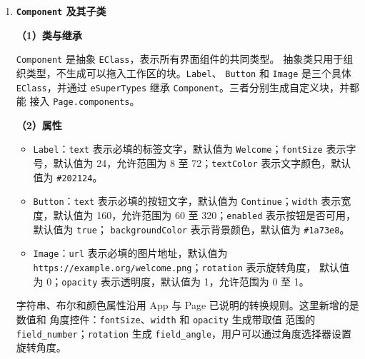 \begin{enumerate}
\begin{lstlisting}[style=tfmjavascript, captionpos=t, caption={\texttt{Page} 块生成代码中的新增部分}, label={lst:basic-generated-page}]
  // EString + field_colour 注解生成颜色选择控件。
  "message3": "backgroundColor %1",
  "args3": [{"type":"field_colour",
             "name":"backgroundColor",
             "colour":"#ffffff"}],

  // 包含引用生成只接受 Component 类型的结构输入。
  "message6": "components %1",
  "args6": [{"type":"input_statement",
             "name":"components",
             "check":"Component"}],

  // Page 块自身只能接入 App.pages 等 Page 类型连接位置。
  "previousStatement": "Page",
  "nextStatement": "Page"
}
\end{lstlisting}

  \texttt{check="Component"} 限定 \texttt{components} 中可接入的块类型；
  \texttt{previousStatement} 和 \texttt{nextStatement} 则声明
  \texttt{Page} 块自身的连接类型，使多个页面能够在 \texttt{App.pages} 中连续
  排列。

  \item \textbf{\texttt{Component} 及其子类}

  \textbf{（1）类与继承}

  \texttt{Component} 是抽象 \texttt{EClass}，表示所有界面组件的共同类型。
  抽象类只用于组织类型，不生成可以拖入工作区的块。\texttt{Label}、
  \texttt{Button} 和 \texttt{Image} 是三个具体 \texttt{EClass}，并通过
  \texttt{eSuperTypes} 继承 \texttt{Component}。三者分别生成自定义块，并都能
  接入 \texttt{Page.components}。

  \textbf{（2）属性}

  \begin{itemize}
    \item \texttt{Label}：\texttt{text} 表示必填的标签文字，默认值为
    \texttt{Welcome}；\texttt{fontSize} 表示字号，默认值为 24，允许范围为
    8 至 72；\texttt{textColor} 表示文字颜色，默认值为 \texttt{\#202124}。
    \item \texttt{Button}：\texttt{text} 表示必填的按钮文字，默认值为
    \texttt{Continue}；\texttt{width} 表示宽度，默认值为 160，允许范围为
    60 至 320；\texttt{enabled} 表示按钮是否可用，默认值为 \texttt{true}；
    \texttt{backgroundColor} 表示背景颜色，默认值为 \texttt{\#1a73e8}。
    \item \texttt{Image}：\texttt{url} 表示必填的图片地址，默认值为
    \mbox{\texttt{https://example.org/welcome.png}}；\texttt{rotation} 表示旋转角度，
    默认值为 0；\texttt{opacity} 表示透明度，默认值为 1，允许范围为 0 至 1。
  \end{itemize}

  字符串、布尔和颜色属性沿用 App 与 Page 已说明的转换规则。这里新增的是数值和
  角度控件：\texttt{fontSize}、\texttt{width} 和 \texttt{opacity} 生成带取值
  范围的 \texttt{field\_number}；\texttt{rotation} 生成
  \texttt{field\_angle}，用户可以通过角度选择器设置旋转角度。


\end{enumerate}
